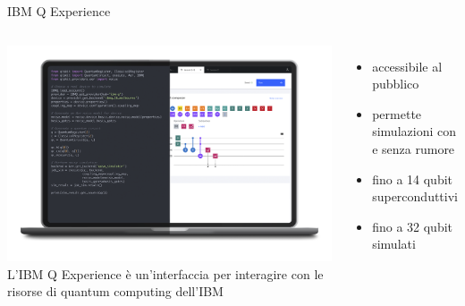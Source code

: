 \documentclass{beamer}
\begin{document}
    \begin{frame}{IBM Q Experience}
        \begin{columns}
            \includegraphics[width=\textwidth]{gfx/laptop_strumenti.png}
            L'IBM Q Experience è un'interfaccia per interagire con le risorse di quantum computing dell'IBM
            \begin{itemize}
                \item accessibile al pubblico
                \item permette simulazioni con e senza rumore
                \item fino a 14 qubit superconduttivi
                \item fino a 32 qubit simulati
            \end{itemize}
        \end{columns}
    \end{frame}
\end{document}
